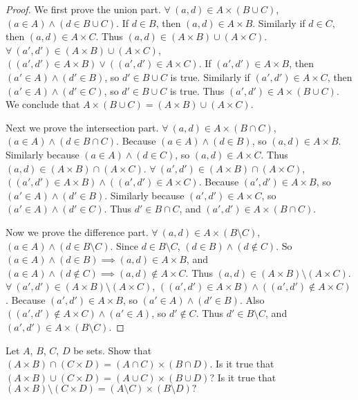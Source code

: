 \begin{proof}
We first prove the union part.
\(\forall\ (a, d) \in A \times (B \cup C)\), \((a \in A) \land (d \in B \cup C)\).
If \(d \in B\), then \((a, d) \in A \times B\).
Similarly if \(d \in C\), then \((a, d) \in A \times C\).
Thus \((a, d) \in (A \times B) \cup (A \times C)\).
\(\forall\ (a', d') \in (A \times B) \cup (A \times C)\), \(((a', d') \in A \times B) \lor ((a', d') \in A \times C)\).
If \((a', d') \in A \times B\), then \((a' \in A) \land (d' \in B)\), so \(d' \in B \cup C\) is true.
Similarly if \((a', d') \in A \times C\), then \((a' \in A) \land (d' \in C)\), so \(d' \in B \cup C\) is true.
Thus \((a', d') \in A \times (B \cup C)\).
We conclude that \(A \times (B \cup C) = (A \times B) \cup (A \times C)\).

Next we prove the intersection part.
\(\forall\ (a, d) \in A \times (B \cap C)\), \((a \in A) \land (d \in B \cap C)\).
Because \((a \in A) \land (d \in B)\), so \((a, d) \in A \times B\).
Similarly because \((a \in A) \land (d \in C)\), so \((a, d) \in A \times C\).
Thus \((a, d) \in (A \times B) \cap (A \times C)\).
\(\forall\ (a', d') \in (A \times B) \cap (A \times C)\), \(((a', d') \in A \times B) \land ((a', d') \in A \times C)\).
Because \((a', d') \in A \times B\), so \((a' \in A) \land (d' \in B)\).
Similarly because \((a', d') \in A \times C\), so \((a' \in A) \land (d' \in C)\).
Thus \(d' \in B \cap C\), and \((a', d') \in A \times (B \cap C)\).

Now we prove the difference part.
\(\forall\ (a, d) \in A \times (B \setminus C)\), \((a \in A) \land (d \in B \setminus C)\).
Since \(d \in B \setminus C\), \((d \in B) \land (d \notin C)\).
So \((a \in A) \land (d \in B) \implies (a, d) \in A \times B\), and \((a \in A) \land (d \notin C) \implies (a, d) \notin A \times C\).
Thus \((a, d) \in (A \times B) \setminus (A \times C)\).
\(\forall\ (a', d') \in (A \times B) \setminus (A \times C)\), \(((a', d') \in A \times B) \land ((a', d') \notin A \times C)\).
Because \((a', d') \in A \times B\), so \((a' \in A) \land (d' \in B)\).
Also \(((a', d') \notin A \times C) \land (a' \in A)\), so \(d' \notin C\).
Thus \(d' \in B \setminus C\), and \((a', d') \in A \times (B \setminus C)\).
\end{proof}

\begin{exercise}\label{ex 3.5.5}
Let \(A\), \(B\), \(C\), \(D\) be sets.
Show that \((A \times B) \cap (C \times D) = (A \cap C) \times (B \cap D)\).
Is it true that \((A \times B) \cup (C \times D) = (A \cup C) \times (B \cup D)?\)
Is it true that \((A \times B) \setminus (C \times D) = (A \setminus C) \times (B \setminus D)?\)
\end{exercise}

